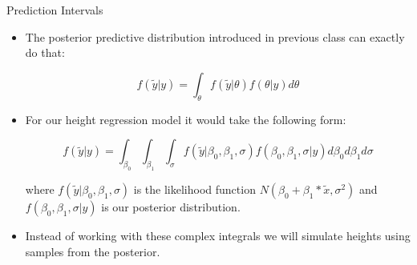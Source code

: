 \documentclass[handout]{beamer}
\begin{document}
\begin{frame}[fragile]{Prediction Intervals}
\scriptsize{
\begin{itemize}


\item The posterior predictive distribution introduced in previous class can exactly do that:

  \begin{displaymath}
 f(\tilde{y}|y)  =  \int_{\theta}f(\tilde{y}|\theta)f(\theta|y)d\theta 
 \end{displaymath}

\item For our height regression model it would take the following form: 

  \begin{displaymath}
 f(\tilde{y}|y)  = \int_{\beta_0} \int_{\beta_1} \int_{\sigma}f(\tilde{y}|\beta_0,\beta_1,\sigma)f(\beta_0,\beta_1,\sigma|y)d\beta_0 d\beta_1 d\sigma
 \end{displaymath}
 
where $f(\tilde{y}|\beta_0,\beta_1,\sigma)$ is the likelihood function $N(\beta_0+\beta_1*\tilde{x},\sigma^2)$ and $f(\beta_0,\beta_1,\sigma|y)$ is our posterior distribution.

\item Instead of working with these complex integrals we will simulate heights using samples from the posterior.

\end{itemize}
 

 
}
\end{frame}
\end{document}
